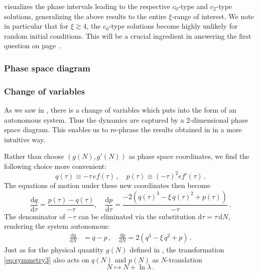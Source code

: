  visualizes the phase intervals leading to the respective $c_{0}$\nobreakdash-type and $c_{2}$\nobreakdash-type solutions, generalizing the above results to the entire $\xi$-range of interest. We note in particular that for $\xi\gtrsim4$, the $c_{0}$\nobreakdash-type solutions become highly unlikely for random initial conditions. This will be a crucial ingredient in answering the first question on page~\pageref{enu:central-questions}. 

\subsubsection{\label{subsec:phase-space}Phase space diagram}

\subsubsection*{Change of variables }

As we saw in , there is a change of variables which puts  into the form of an autonomous system. Thus the dynamics are captured by a 2-dimensional phase space diagram. This enables us to re-phrase the results obtained in  in a more intuitive way.

Rather than choose $(g(N),g'(N))$ as phase space coordinates, we find the following choice more convenient: 
\begin{equation}
q(\tau)\equiv-\tau\,ef(\tau)\,,\quad p(\tau)\equiv(-\tau)^{2}ef'(\tau)\,.\label{eq:cov}
\end{equation}
The equations of motion under these new coordinates then become 
\[
\frac{\mathrm{d}q}{\mathrm{d}\tau}=\frac{p(\tau)-q(\tau)}{-\tau},\quad\frac{\mathrm{d}p}{\mathrm{d}\tau}=\frac{-2\left(q(\tau)^{3}-\xi\,q(\tau)^{2}+p(\tau)\right)}{-\tau}\,.
\]
The denominator of $-\tau$ can be eliminated via the substitution $\mathrm{d}\tau=\tau\,\mathrm{d}N$, rendering the system autonomous: 
\begin{align}
\frac{\mathrm{d}q}{\mathrm{d}N} & =q-p\,,\quad\frac{\mathrm{d}p}{\mathrm{d}N}=2(q^{3}-\xi\,q^{2}+p)\,.\label{eq:q-p-eom}
\end{align}
Just as for the physical quantity $g(N)$ defined in , the transformation \eqref{eq:symmetry3} also acts on $q(N)$ and $p(N)$ as $N$-translation 
\begin{equation}
N\mapsto N+\ln\lambda\,.\label{eq:lambda-time-translation}
\end{equation}

